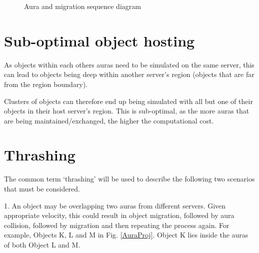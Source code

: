 \begin{figure}[!t]
	\caption{Aura and migration sequence diagram}
	\label{sequence_diagram}
\end{figure}

\section{Sub-optimal object hosting}
As objects within each others auras need to be simulated on the same server, this can lead to objects being deep within another server's region (objects that are far from the region boundary).

Clusters of objects can therefore end up being simulated with all but one of their objects in their host server's region. This is sub-optimal, as the more auras that are being maintained/exchanged, the higher the computational cost.

\section{Thrashing}\label{Thrashing}
The common term `thrashing' will be used to describe the following two scenarios that must be considered.

1. An object may be overlapping two auras from different servers. Given appropriate velocity, this could result in object migration, followed by aura collision, followed by migration and then repeating the process again. For example, Objects K, L and M in Fig. \ref{AuraProj}. Object K lies inside the auras of both Object L and M. 

